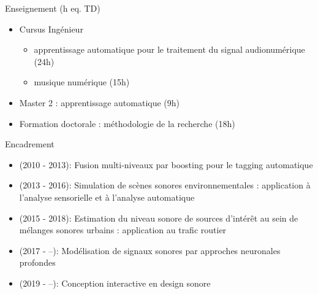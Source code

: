 \begin{frame}{Enseignement (h eq. TD)}
\begin{itemize}
  \item Cursus Ingénieur
  \begin{itemize}
    \item apprentissage automatique pour le traitement du signal audionumérique (24h)
    \item musique numérique (15h)
  \end{itemize}
  \item Master 2 : apprentissage automatique (9h)
  \item Formation doctorale : méthodologie de la recherche (18h)
\end{itemize}
\end{frame}

\begin{frame}{Encadrement}
\begin{itemize}
  \item {} (2010 - 2013): \og Fusion multi-niveaux par boosting pour le tagging automatique \fg
  \item {} (2013 - 2016): \og Simulation de scènes sonores environnementales : application à l'analyse sensorielle et à l'analyse automatique \fg
  \item {} (2015 - 2018): \og Estimation du niveau sonore de sources d'intérêt au sein de mélanges sonores urbains : application au trafic routier \fg
  \item {} (2017 - --): \og Modélisation de signaux sonores par approches neuronales profondes \fg
  \item {} (2019 - --): \og Conception interactive en design sonore \fg
\end{itemize}
\end{frame}

